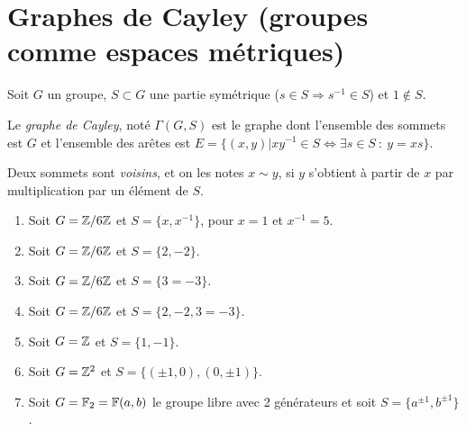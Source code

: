 
\chapter{Graphes de Cayley (groupes comme espaces métriques)}
\label{sec:graphes-de-Cayley}

  Soit $G$ un groupe, $S \subset G$ une partie symétrique ($s \in S \Rightarrow s^{-1} \in S$) et $1 \notin
  S$.

  \begin{defi} 
    Le \emph{graphe de Cayley}, noté $\Gamma(G, S)$ est le graphe dont l'ensemble des sommets est $G$ et
    l'ensemble des arêtes est $E = \{(x,y) | xy^{-1} \in S \iff \exists s \in S\ :\ y = xs\}$.

    Deux sommets sont \emph{voisins}, et on les notes $x \sim y$, si $y$ s'obtient à partir de $x$ par
    multiplication par un élément de $S$.
  \end{defi}

  \begin{exs}
    \begin{enumerate}
    \item Soit $G = \mathbb{Z}/6\mathbb{Z}$ et $S = \{x, x^{-1}\}$, pour $x = 1$ et $x^{-1} = 5$.

    \item Soit $G = \mathbb{Z}/6\mathbb{Z}$ et $S = \{2, -2\}$.

    \item Soit $G = \mathbb{Z}/6\mathbb{Z}$ et $S = \{3 = -3\}$.

    \item Soit $G = \mathbb{Z}/6\mathbb{Z}$ et $S = \{2, -2, 3 = -3\}$.

    \item Soit $G = \mathbb{Z}$ et $S = \{1, -1\}$.

    \item Soit $G = \mathbb{Z}^2$ et $S = \{(\pm 1, 0), (0, \pm 1)\}$.

    \item Soit $G = \mathbb{F}_2 = \mathbb{F}(a,b)$ le groupe libre avec 2 générateurs et soit $S = \{a^{\pm 1}, b^{\pm 1}\}$.
    \end{enumerate}
  \end{exs}

